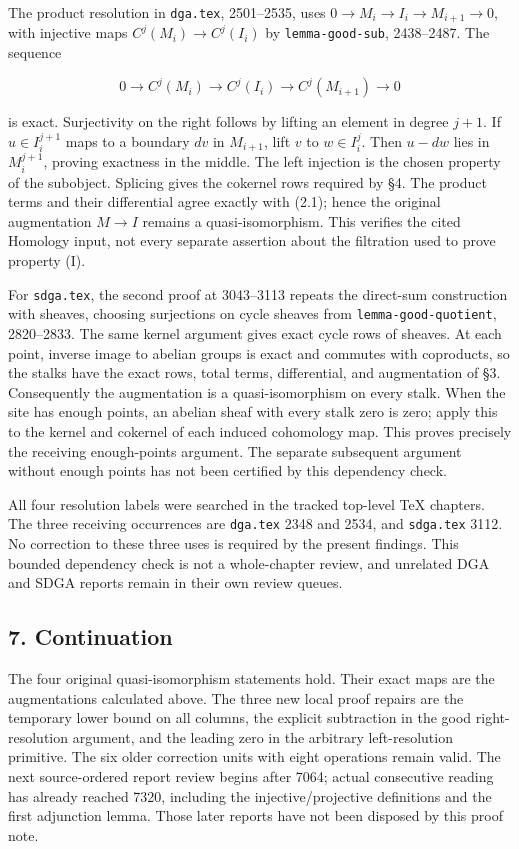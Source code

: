 \documentclass[11pt]{article}
\begin{document}
The product resolution in \texttt{dga.tex}, 2501--2535, uses \(0\to M_i\to I_i\to M_{i+1}\to0\), with injective maps \(C^j(M_i)\to C^j(I_i)\) by \texttt{lemma-good-sub}, 2438--2487. The sequence

\[
0\to C^j(M_i)\to C^j(I_i)\to C^j(M_{i+1})\to0
\]

is exact. Surjectivity on the right follows by lifting an element in degree \(j+1\). If \(u\in I_i^{j+1}\) maps to a boundary \(dv\) in \(M_{i+1}\), lift \(v\) to \(w\in I_i^j\). Then \(u-dw\) lies in \(M_i^{j+1}\), proving exactness in the middle. The left injection is the chosen property of the subobject. Splicing gives the cokernel rows required by §4. The product terms and their differential agree exactly with (2.1); hence the original augmentation \(M\to I\) remains a quasi-isomorphism. This verifies the cited Homology input, not every separate assertion about the filtration used to prove property (I).

For \texttt{sdga.tex}, the second proof at 3043--3113 repeats the direct-sum construction with sheaves, choosing surjections on cycle sheaves from \texttt{lemma-good-quotient}, 2820--2833. The same kernel argument gives exact cycle rows of sheaves. At each point, inverse image to abelian groups is exact and commutes with coproducts, so the stalks have the exact rows, total terms, differential, and augmentation of §3. Consequently the augmentation is a quasi-isomorphism on every stalk. When the site has enough points, an abelian sheaf with every stalk zero is zero; apply this to the kernel and cokernel of each induced cohomology map. This proves precisely the receiving enough-points argument. The separate subsequent argument without enough points has not been certified by this dependency check.

All four resolution labels were searched in the tracked top-level TeX chapters. The three receiving occurrences are \texttt{dga.tex} 2348 and 2534, and \texttt{sdga.tex} 3112. No correction to these three uses is required by the present findings. This bounded dependency check is not a whole-chapter review, and unrelated DGA and SDGA reports remain in their own review queues.

\subsection{7. Continuation}\label{note-08-continuation}

The four original quasi-isomorphism statements hold. Their exact maps are the augmentations calculated above. The three new local proof repairs are the temporary lower bound on all columns, the explicit subtraction in the good right-resolution argument, and the leading zero in the arbitrary left-resolution primitive. The six older correction units with eight operations remain valid. The next source-ordered report review begins after 7064; actual consecutive reading has already reached 7320, including the injective/projective definitions and the first adjunction lemma. Those later reports have not been disposed by this proof note.
\clearpage
\end{document}
